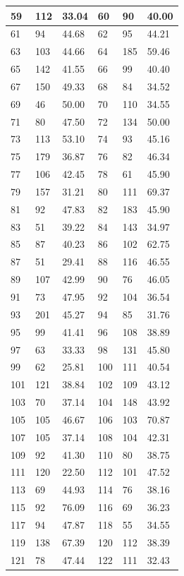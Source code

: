 \documentclass[10.9pt]{article} %
\begin{document}
{\begin{longtable}{|p{2cm}|p{2cm}|p{2cm}|p{2cm}|p{2cm}|p{2cm}|}
59 & 112& 33.04 & 60 & 90& 40.00\\
\hline
61 & 94& 44.68 & 62 & 95& 44.21\\
\hline
63 & 103& 44.66 & 64 & 185& 59.46\\
\hline
65 & 142& 41.55 & 66 & 99& 40.40\\
\hline
67 & 150& 49.33 & 68 & 84& 34.52\\
\hline
69 & 46& 50.00 & 70 & 110& 34.55\\
\hline
71 & 80& 47.50 & 72 & 134& 50.00\\
\hline
73 & 113& 53.10 & 74 & 93& 45.16\\
\hline
75 & 179& 36.87 & 76 & 82& 46.34\\
\hline
77 & 106& 42.45 & 78 & 61& 45.90\\
\hline
79 & 157& 31.21 & 80 & 111& 69.37\\
\hline
81 & 92& 47.83 & 82 & 183& 45.90\\
\hline
83 & 51& 39.22 & 84 & 143& 34.97\\
\hline
85 & 87& 40.23 & 86 & 102& 62.75\\
\hline
87 & 51& 29.41 & 88 & 116& 46.55\\
\hline
89 & 107& 42.99 & 90 & 76& 46.05\\
\hline
91 & 73& 47.95 & 92 & 104& 36.54\\
\hline
93 & 201& 45.27 & 94 & 85& 31.76\\
\hline
95 & 99& 41.41 & 96 & 108& 38.89\\
\hline
97 & 63& 33.33 & 98 & 131& 45.80\\
\hline
99 & 62& 25.81 & 100 & 111& 40.54\\
\hline
101 & 121& 38.84 & 102 & 109& 43.12\\
\hline
103 & 70& 37.14 & 104 & 148& 43.92\\
\hline
105 & 105& 46.67 & 106 & 103& 70.87\\
\hline
107 & 105& 37.14 & 108 & 104& 42.31\\
\hline
109 & 92& 41.30 & 110 & 80& 38.75\\
\hline
111 & 120& 22.50 & 112 & 101& 47.52\\
\hline
113 & 69& 44.93 & 114 & 76& 38.16\\
\hline
115 & 92& 76.09 & 116 & 69& 36.23\\
\hline
117 & 94& 47.87 & 118 & 55& 34.55\\
\hline
119 & 138& 67.39 & 120 & 112& 38.39\\
\hline
121 & 78& 47.44 & 122 & 111& 32.43\\

\end{longtable}}
\end{document}
